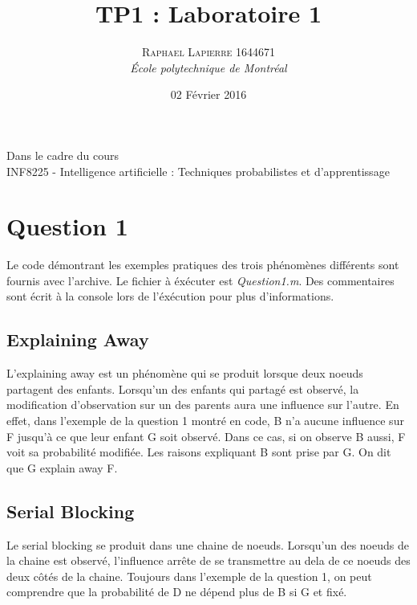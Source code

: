 \documentclass[a4paper, 12pt]{article} %
\title{TP1 : Laboratoire 1}
\author{\textsc{Raphael Lapierre 1644671} %
\vspace{10pt}
\\{\textit{École polytechnique de Montréal}}} %
\date{02 Février 2016} %
\makeatletter
\renewcommand{\maketitle}{ %
\begin{center} %

\vspace*{25pt} %
{\LARGE\@title} %

\vspace{125pt} %

{\large\@author} %

\vspace{125pt} %
Dans le cadre du cours
\\INF8225 - Intelligence artificielle : Techniques probabilistes et d'apprentissage
\vspace{125pt} %
\\\@date %
\vspace{125pt} %

\end{center}
}
\makeatother
\begin{document}
\thispagestyle{empty}
\clearpage\maketitle %
\pagebreak[4]

\setlength{\headheight}{15.0pt}
\pagestyle{fancy}
\fancyhead[C]{}

\section*{Question 1}
Le code démontrant les exemples pratiques des trois phénomènes différents sont 
fournis avec l'archive. Le fichier à éxécuter est \textit{Question1.m}.
Des commentaires sont écrit à la console lors de l'éxécution pour plus d'informations.

\subsection*{Explaining Away}
L'explaining away est un phénomène qui se produit lorsque deux noeuds partagent des enfants.
Lorsqu'un des enfants qui partagé est observé, la modification d'observation sur un des parents
aura une influence sur l'autre. En effet, dans l'exemple de la question 1 montré en code, 
B n'a aucune influence sur F jusqu'à ce que leur enfant G soit observé. Dans ce cas, si on observe
B aussi, F voit sa probabilité modifiée. Les raisons expliquant B sont prise par G. On dit que 
G explain away F.

\subsection*{Serial Blocking}
Le serial blocking se produit dans une chaine de noeuds. Lorsqu'un des noeuds de la chaine
est observé, l'influence arrête de se transmettre au dela de ce noeuds des deux côtés de la
chaine. Toujours dans l'exemple de la question 1, on peut comprendre que la probabilité de 
D ne dépend plus de B si G et fixé.
\end{document}
